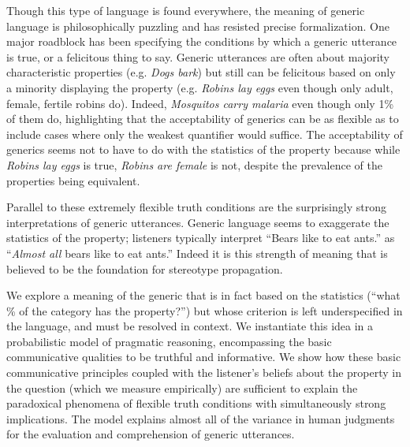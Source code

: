 \documentclass[11pt,stdletter,dateno,sigleft]{newlfm} %
\begin{document}
\begin{newlfm}
Though this type of language is found everywhere, the meaning of generic language is philosophically puzzling and has resisted precise formalization. 
One major roadblock has been specifying the conditions by which a generic utterance is true, or a felicitous thing to say.
Generic utterances are often about majority characteristic properties (e.g. \emph{Dogs bark}) but still can be felicitous based on only a minority displaying the property (e.g. \emph{Robins lay eggs} even though only adult, female, fertile robins do). 
Indeed, \emph{Mosquitos carry malaria} even though only 1\% of them do, highlighting that the acceptability of generics can be as flexible as to include cases where only the weakest quantifier would suffice. 
The acceptability of generics seems not to have to do with the statistics of the property because while \emph{Robins lay eggs} is true, \emph{Robins are female} is not, despite the prevalence of the properties being equivalent. 

Parallel to these extremely flexible truth conditions are the surprisingly strong interpretations of generic utterances.
Generic language seems to exaggerate the statistics of the property; listeners typically interpret ``Bears like to eat ants.'' as ``\emph{Almost all} bears like to eat ants.''
Indeed it is this strength of meaning that is believed to be the foundation for stereotype propagation. 


% 

We explore a meaning of the generic that is in fact based on the statistics (``what \% of the category has the property?'') but 
whose criterion is left underspecified in the language, and must be resolved in context.
We instantiate this idea in a probabilistic model of pragmatic reasoning, encompassing the basic communicative qualities to be truthful and informative. 
We show how these basic communicative principles coupled with the listener's beliefs about the property in the question (which we measure empirically) are sufficient to explain the paradoxical phenomena of flexible truth conditions with simultaneously strong implications.
The model explains almost all of the variance in human judgments for the evaluation and comprehension of generic utterances.


\end{newlfm}
\end{document}
